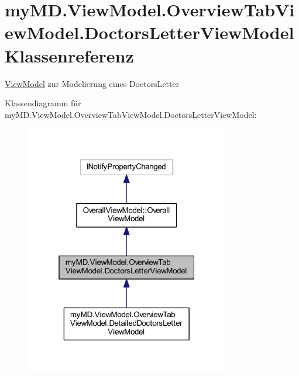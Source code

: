 \hypertarget{classmy_m_d_1_1_view_model_1_1_overview_tab_view_model_1_1_doctors_letter_view_model}{}\section{my\+M\+D.\+View\+Model.\+Overview\+Tab\+View\+Model.\+Doctors\+Letter\+View\+Model Klassenreferenz}
\label{classmy_m_d_1_1_view_model_1_1_overview_tab_view_model_1_1_doctors_letter_view_model}


\mbox{\hyperlink{namespacemy_m_d_1_1_view_model}{View\+Model}} zur Modelierung eines Doctors\+Letter  




Klassendiagramm für my\+M\+D.\+View\+Model.\+Overview\+Tab\+View\+Model.\+Doctors\+Letter\+View\+Model\+:\nopagebreak
\begin{figure}[H]
\begin{center}
\leavevmode
\includegraphics[width=253pt]{classmy_m_d_1_1_view_model_1_1_overview_tab_view_model_1_1_doctors_letter_view_model__inherit__graph}
\end{center}
\end{figure}


